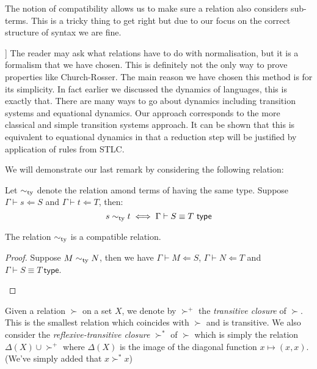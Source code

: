 \begin{remark}
    The notion of compatibility allows us to make sure a relation also considers sub-terms. This is a tricky thing to get right but due to our focus on the correct structure of syntax we are fine.
\end{remark}

\begin{remark}
[[CLEAN THIS UP]]
    The reader may ask what relations have to do with normalisation, but it is a formalism that we have chosen. This is definitely not the only way to prove properties like Church-Rosser. The main reason we have chosen this method is for its simplicity. In fact earlier we discussed the dynamics of languages, this is exactly that. There are many ways to go about dynamics including transition systems and equational dynamics. Our approach corresponds to the more classical and simple transition systems approach. It can be shown that this is equivalent to equational dynamics in that a reduction step will be justified by application of rules from STLC.
\end{remark}

We will demonstrate our last remark by considering the following relation:

\begin{defin}
    Let $\sim_{\mathrm{ty}}$ denote the relation amond terms of having the same type. Suppose $\Gamma \vdash s \Leftarrow S$ and $\Gamma \vdash t \Leftarrow T$, then:
    $$
        s \sim_{\mathrm{ty}} t \iff \Gamma \vdash S \equiv T \ \mathsf{type}
    $$
\end{defin}

\begin{lemma}
    The relation $\sim_{\mathrm{ty}}$ is a compatible relation.
\end{lemma}

\begin{proof}
    Suppose $M \sim_{\mathrm{ty}} N$, then we have $\Gamma \vdash M \Leftarrow S$, $\Gamma \vdash N \Leftarrow T$ and $\Gamma \vdash S \equiv T \ \mathsf{type}$.
    \begin{enumerate}
        
    \end{enumerate}
\end{proof}

\begin{defin}
    Given a relation $\succ$ on a set $X$, we denote by $\succ^+$ the \emph{transitive closure} of $\succ$. This is the smallest relation which coincides with $\succ$ and is transitive. We also consider the \emph{reflexive-transitive closure} $\succ^*$ of $\succ$ which is simply the relation $\Delta(X)\cup \succ^+ $ where $\Delta(X)$ is the image of the diagonal function $x \mapsto (x,x)$. (We've simply added that $x \succ^* x$)
\end{defin}

